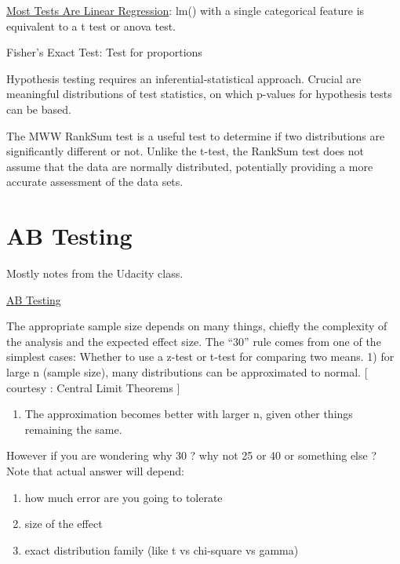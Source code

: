 \documentclass[]{book}
\providecommand{\tightlist}{%
  \setlength{\itemsep}{0pt}\setlength{\parskip}{0pt}}
\begin{document}
\href{https://lindeloev.github.io/tests-as-linear/}{Most Tests Are Linear Regression}: lm() with a single categorical feature is equivalent to a t test or anova test.

Fisher's Exact Test: Test for proportions

Hypothesis testing requires an inferential-statistical approach. Crucial are meaningful distributions of test statistics, on which p-values for hypothesis tests can be based.

The MWW RankSum test is a useful test to determine if two distributions are significantly different or not. Unlike the t-test, the RankSum test does not assume that the data are normally distributed, potentially providing a more accurate assessment of the data sets.

\hypertarget{ab-testing}{%
\section{AB Testing}\label{ab-testing}}

Mostly notes from the Udacity class.

\href{http://www.evanmiller.org/announcing-evans-awesome-ab-tools.html}{AB Testing}

The appropriate sample size depends on many things, chiefly the complexity of the analysis and the expected effect size. The ``30'' rule comes from one of the simplest cases: Whether to use a z-test or t-test for comparing two means.
1) for large n (sample size), many distributions can be approximated to normal. {[} courtesy : Central Limit Theorems {]}

\begin{enumerate}
\def\labelenumi{\arabic{enumi})}
\setcounter{enumi}{1}
\tightlist
\item
  The approximation becomes better with larger n, given other things remaining the same.
\end{enumerate}

However if you are wondering why 30 ? why not 25 or 40 or something else ? Note that actual answer will depend:

\begin{enumerate}
\def\labelenumi{\arabic{enumi})}
\item
  how much error are you going to tolerate
\item
  size of the effect
\item
  exact distribution family (like t vs chi-square vs gamma)
\end{enumerate}
\end{document}
